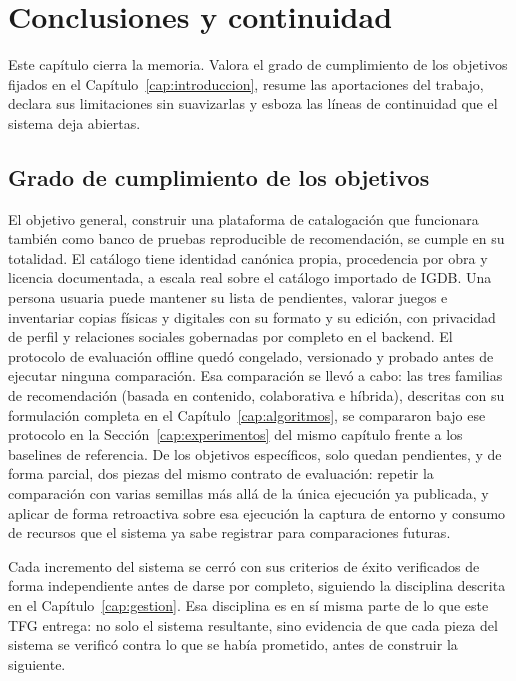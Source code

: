 \chapter{Conclusiones y continuidad}\label{cap:conclusiones}

Este capítulo cierra la memoria. Valora el grado de cumplimiento de los objetivos fijados en
el Capítulo~\ref{cap:introduccion}, resume las aportaciones del trabajo, declara sus
limitaciones sin suavizarlas y esboza las líneas de continuidad que el sistema deja abiertas.

\section{Grado de cumplimiento de los objetivos}\label{sec:conc-objetivos}

El objetivo general, construir una plataforma de catalogación que funcionara también como
banco de pruebas reproducible de recomendación, se cumple en su totalidad. El catálogo tiene
identidad canónica propia, procedencia por obra y licencia documentada, a escala real sobre
el catálogo importado de IGDB. Una persona usuaria puede mantener su lista de pendientes,
valorar juegos e inventariar copias físicas y digitales con su formato y su edición, con
privacidad de perfil y relaciones sociales gobernadas por completo en el backend. El protocolo
de evaluación offline quedó congelado, versionado y probado antes de ejecutar ninguna
comparación. Esa comparación se llevó a cabo: las tres familias de recomendación
(basada en contenido, colaborativa e híbrida), descritas con su formulación completa en el
Capítulo~\ref{cap:algoritmos}, se compararon bajo ese protocolo en la Sección~\ref{cap:experimentos}
del mismo capítulo frente a los baselines de referencia. De los objetivos específicos, solo quedan pendientes,
y de forma parcial, dos piezas del mismo contrato de evaluación: repetir la comparación con
varias semillas más allá de la única ejecución ya publicada, y aplicar de forma retroactiva
sobre esa ejecución la captura de entorno y consumo de recursos que el sistema ya sabe
registrar para comparaciones futuras.

Cada incremento del sistema se cerró con sus criterios de éxito verificados de forma
independiente antes de darse por completo, siguiendo la disciplina descrita en el
Capítulo~\ref{cap:gestion}. Esa disciplina es en sí misma parte de lo que este TFG entrega: no
solo el sistema resultante, sino evidencia de que cada pieza del sistema se verificó contra lo
que se había prometido, antes de construir la siguiente.

